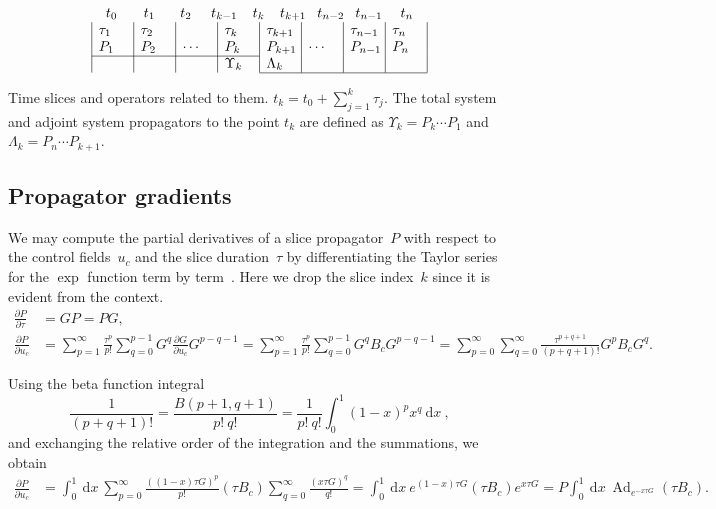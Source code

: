 \documentclass[aps, pra, a4paper, longbibliography, superscriptaddress]{revtex4-1}
\newcommand{\be}{\begin{equation}}
\newcommand{\ee}{\end{equation}}
\DeclareMathOperator{\Ad}{Ad}
\newcommand{\spr}{\Upsilon}
\newcommand{\dd}[2]{\frac{\partial #1}{\partial #2}}
\newcommand{\wrt}[1]{\:\mathrm{d}#1\:} %
\begin{document}
\begin{table}[h]
\[
\begin{array}{c}
\begin{array}{@{t_0}p{1.9em}@{t_1}p{1.8em}@{t_2}p{1.4em}@{t_{k-1}}p{1.1em}@{t_{k}}p{1.1em}@{t_{k+1}}p{0.8em}@{t_{n-2}}p{0.8em}@{t_{n-1}}p{1.3em}@{t_n}}
& & & & & & &
\end{array}\\
\begin{array}{|p{2em}|p{2em}|p{2em}|p{2em}|p{2em}|p{2em}|p{2em}|p{2em}|}
 $\tau_1$ & $\tau_2$ & & $\tau_k$ & $\tau_{k+1}$ & & $\tau_{n-1}$ & $\tau_n$ \\
 $P_1$ & $P_2$ & $\cdots$ & $P_k$ & $P_{k+1}$ & $\cdots$ & $P_{n-1}$ & $P_n$ \\
\cline{1-4}
& & & $\spr_{k}$ & $\Lambda_{k}$ & & & \\
\cline{5-8}
\end{array}
\end{array}
\]
\caption{Time slices and operators related to them.
$t_k = t_0 + \sum_{j=1}^{k} \tau_j$.
The total system and adjoint system
propagators to the point $t_k$ are defined as
$\spr_k = P_k \cdots P_1$ and
$\Lambda_k = P_{n} \cdots P_{k+1}$.
\label{table:slices}
}
\end{table}


\subsection{Propagator gradients}

We may compute the partial derivatives of a slice propagator~$P$ with
respect to the control fields~$u_c$ and the slice duration~$\tau$ by
differentiating the Taylor series for the $\exp$ function term by
term~\cite{Najfeld1995,deFouquieres2011}.
Here we drop the slice index~$k$ since it is evident from the context.
\begin{align}
\dd{P}{\tau}  &= G P = P G,\\
\label{eq:dPdu_series}
\dd{P}{u_{c}}
&=
\sum_{p=1}^{\infty} \frac{\tau^p}{p!}
\sum_{q=0}^{p-1}
G^{q} \dd{G}{u_{c}} G^{p-q-1}
=
\sum_{p=1}^{\infty} \frac{\tau^p}{p!}
\sum_{q=0}^{p-1}
G^{q} B_c G^{p-q-1}
=
\sum_{p=0}^\infty \sum_{q=0}^\infty
\frac{\tau^{p+q+1}}{(p+q+1)!}
G^{p} B_c G^{q}.
\end{align}

Using the beta function integral
\be
\frac{1}{(p+q+1)!} = \frac{B(p+1, q+1)}{p! \: q!} = \frac{1}{p! \: q!} \int_0^1 (1-x)^p x^q \wrt{x},
\ee
and exchanging the relative order of the integration and the summations,
we obtain
\begin{align}
\label{eq:dPdu_int}
\dd{P}{u_{c}}
&=
\int_0^1 \wrt{x}
\sum_{p=0}^\infty 
\frac{((1-x)\tau G)^{p}}{p!}
(\tau B_c)
\sum_{q=0}^\infty
\frac{(x \tau G)^{q}}{q!}
=
\int_0^1 \wrt{x}
e^{(1-x)\tau G}
(\tau B_c)
e^{x \tau G}
=
P
\int_0^1 \wrt{x}
\Ad_{e^{-x\tau G}}
(\tau B_c).
\end{align}
\end{document}
